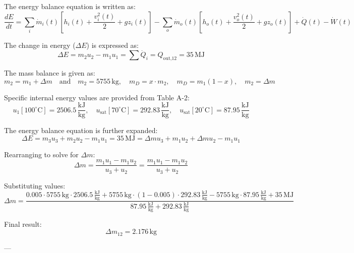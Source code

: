 The energy balance equation is written as:  
\[
\frac{dE}{dt} = \sum_i \dot{m}_i(t) \left[ h_i(t) + \frac{v_i^2(t)}{2} + g z_i(t) \right] - \sum_o \dot{m}_o(t) \left[ h_o(t) + \frac{v_o^2(t)}{2} + g z_o(t) \right] + \dot{Q}(t) - \dot{W}(t)
\]  

The change in energy (\( \Delta E \)) is expressed as:  
\[
\Delta E = m_2 u_2 - m_1 u_1 = \sum \dot{Q}_i = Q_{\text{out,12}} = 35 \, \text{MJ}
\]  

The mass balance is given as:  
\[
m_2 = m_1 + \Delta m \quad \text{and} \quad m_2 = 5755 \, \text{kg}, \quad m_D = x \cdot m_2, \quad m_D = m_1 (1 - x), \quad m_2 = \Delta m
\]  

Specific internal energy values are provided from Table A-2:  
\[
u_1 [100^\circ\text{C}] = 2506.5 \, \frac{\text{kJ}}{\text{kg}}, \quad u_{\text{sat}} [70^\circ\text{C}] = 292.83 \, \frac{\text{kJ}}{\text{kg}}, \quad u_{\text{sat}} [20^\circ\text{C}] = 87.95 \, \frac{\text{kJ}}{\text{kg}}
\]  

The energy balance equation is further expanded:  
\[
\Delta E = m_3 u_3 + m_2 u_2 - m_1 u_1 = 35 \, \text{MJ} = \Delta m u_3 + m_1 u_2 + \Delta m u_2 - m_1 u_1
\]  

Rearranging to solve for \( \Delta m \):  
\[
\Delta m = \frac{m_1 u_1 - m_1 u_2}{u_3 + u_2} = \frac{m_1 u_1 - m_1 u_2}{u_3 + u_2}
\]  

Substituting values:  
\[
\Delta m = \frac{0.005 \cdot 5755 \, \text{kg} \cdot 2506.5 \, \frac{\text{kJ}}{\text{kg}} + 5755 \, \text{kg} \cdot (1 - 0.005) \cdot 292.83 \, \frac{\text{kJ}}{\text{kg}} - 5755 \, \text{kg} \cdot 87.95 \, \frac{\text{kJ}}{\text{kg}} + 35 \, \text{MJ}}{87.95 \, \frac{\text{kJ}}{\text{kg}} + 292.83 \, \frac{\text{kJ}}{\text{kg}}}
\]  

Final result:  
\[
\Delta m_{12} = 2.176 \, \text{kg}
\]  

---